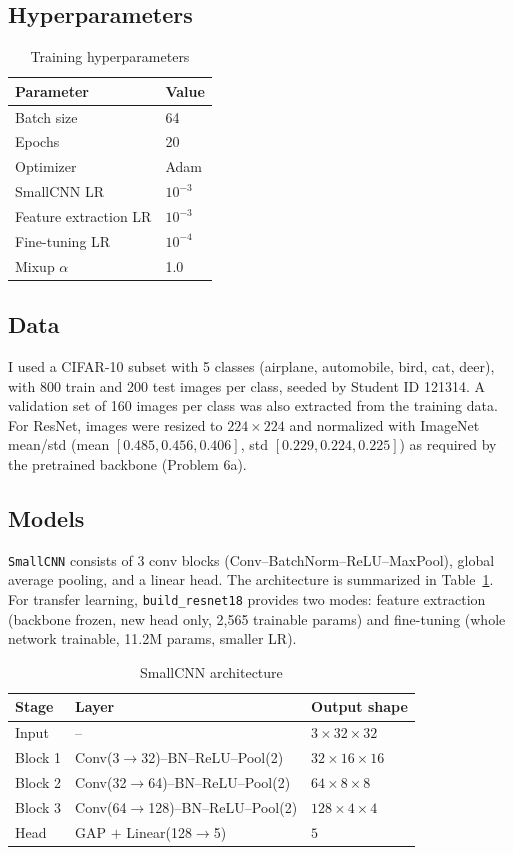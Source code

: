 \documentclass[10pt,twocolumn,letterpaper]{article}
\begin{document}
\subsection{Hyperparameters}
\begin{table}[t]
\caption{Training hyperparameters}
\centering
\begin{tabular}{ll}
\toprule
Parameter & Value \\
\midrule
Batch size & 64 \\
Epochs & 20 \\
Optimizer & Adam \\
SmallCNN LR & $10^{-3}$ \\
Feature extraction LR & $10^{-3}$ \\
Fine-tuning LR & $10^{-4}$ \\
Mixup $\alpha$ & 1.0 \\
\bottomrule
\end{tabular}
\end{table}

\subsection{Data}
I used a CIFAR-10 subset with 5 classes (airplane, automobile, bird, cat, deer),
with 800 train and 200 test images per class, seeded by Student ID 121314. A
validation set of 160 images per class was also extracted from the training
data. For ResNet, images were resized to $224\times224$ and normalized with
ImageNet mean/std (mean $[0.485,0.456,0.406]$, std $[0.229,0.224,0.225]$) as
required by the pretrained backbone (Problem 6a).

\subsection{Models}

\texttt{SmallCNN} consists of 3 conv blocks (Conv--BatchNorm--ReLU--MaxPool),
global average pooling, and a linear head. The architecture is summarized in
Table~\ref{tab:arch}. For transfer learning, \texttt{build\_resnet18} provides
two modes: feature extraction (backbone frozen, new head only, 2,565 trainable
params) and fine-tuning (whole network trainable, 11.2M params, smaller LR).

\begin{table}[t]
\caption{SmallCNN architecture}
\label{tab:arch}
\centering
\begin{tabular}{lll}
\toprule
Stage & Layer & Output shape \\
\midrule
Input   & --                                   & $3\times32\times32$ \\
Block 1 & Conv(3$\to$32)--BN--ReLU--Pool(2) & $32\times16\times16$ \\
Block 2 & Conv(32$\to$64)--BN--ReLU--Pool(2)& $64\times8\times8$ \\
Block 3 & Conv(64$\to$128)--BN--ReLU--Pool(2)& $128\times4\times4$ \\
Head    & GAP $+$ Linear(128$\to$5)           & $5$ \\
\bottomrule
\end{tabular}
\end{table}
\end{document}
